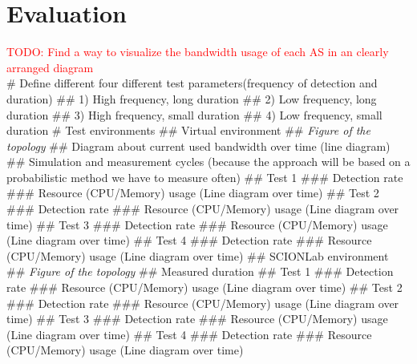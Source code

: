 \documentclass[thesis.tex]{subfiles}
\begin{document}
\chapter{Evaluation}\label{chap:eva}
\begin{easylist}
    \textcolor{red}{TODO: Find a way to visualize the bandwidth usage of each AS in an clearly arranged diagram}\\
    # Define different four different test parameters(frequency of detection and duration) 
    ## 1) High frequency, long duration
    ## 2) Low frequency, long duration
    ## 3) High frequency, small duration
    ## 4) Low frequency, small duration
    # Test environments
    ## Virtual environment
    ## \textit{Figure of the topology}
    ## Diagram about current used bandwidth over time (line diagram)
    ## Simulation and measurement cycles (because the approach will be based on a probabilistic method we have to measure often)
    ## Test 1
    ### Detection rate
    ### Resource (CPU/Memory) usage (Line diagram over time)
    ## Test 2
    ### Detection rate
    ### Resource (CPU/Memory) usage (Line diagram over time)
    ## Test 3 
    ### Detection rate
    ### Resource (CPU/Memory) usage (Line diagram over time)
    ## Test 4 
    ### Detection rate
    ### Resource (CPU/Memory) usage (Line diagram over time)
    ## SCIONLab environment
    ## \textit{Figure of the topology}
    ## Measured duration
    ## Test 1
    ### Detection rate
    ### Resource (CPU/Memory) usage (Line diagram over time)
    ## Test 2
    ### Detection rate
    ### Resource (CPU/Memory) usage (Line diagram over time)
    ## Test 3 
    ### Detection rate
    ### Resource (CPU/Memory) usage (Line diagram over time)
    ## Test 4 
    ### Detection rate
    ### Resource (CPU/Memory) usage (Line diagram over time)
\end{easylist}

\subfilebib %
\end{document}
